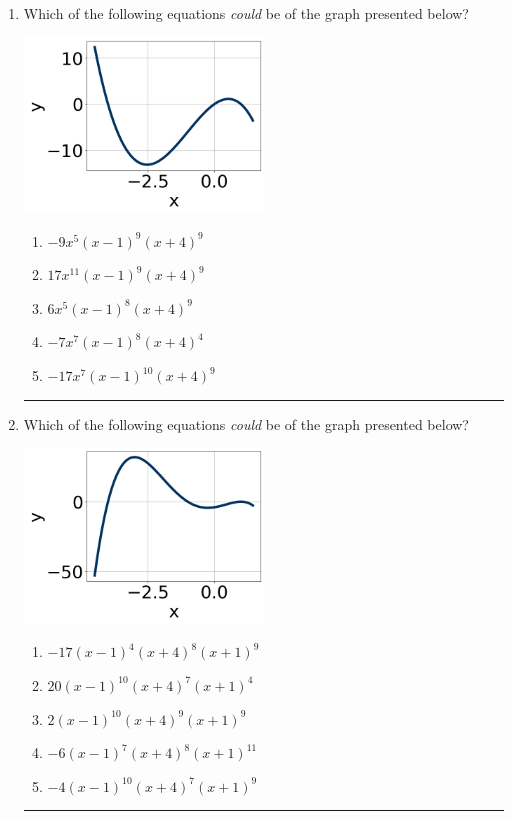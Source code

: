 \documentclass[14pt]{extbook}
\newcommand{\litem}[1]{\item#1\hspace*{-1cm}\rule{\textwidth}{0.4pt}}
\begin{document}
\begin{enumerate}
{\begin{enumerate}[label=\Alph*.]
\end{enumerate} }
\litem{
Which of the following equations \textit{could} be of the graph presented below?
\begin{center}
    \includegraphics[width=0.5\textwidth]{../Figures/polyGraphToFunctionB.png}
\end{center}
\begin{enumerate}[label=\Alph*.]
\item \( -9x^{5} (x - 1)^{9} (x + 4)^{9} \)
\item \( 17x^{11} (x - 1)^{9} (x + 4)^{9} \)
\item \( 6x^{5} (x - 1)^{8} (x + 4)^{9} \)
\item \( -7x^{7} (x - 1)^{8} (x + 4)^{4} \)
\item \( -17x^{7} (x - 1)^{10} (x + 4)^{9} \)

\end{enumerate} }
\litem{
Which of the following equations \textit{could} be of the graph presented below?
\begin{center}
    \includegraphics[width=0.5\textwidth]{../Figures/polyGraphToFunctionCopyB.png}
\end{center}
\begin{enumerate}[label=\Alph*.]
\item \( -17(x - 1)^{4} (x + 4)^{8} (x + 1)^{9} \)
\item \( 20(x - 1)^{10} (x + 4)^{7} (x + 1)^{4} \)
\item \( 2(x - 1)^{10} (x + 4)^{9} (x + 1)^{9} \)
\item \( -6(x - 1)^{7} (x + 4)^{8} (x + 1)^{11} \)
\item \( -4(x - 1)^{10} (x + 4)^{7} (x + 1)^{9} \)


\end{enumerate}}
\end{enumerate}
\end{document}
